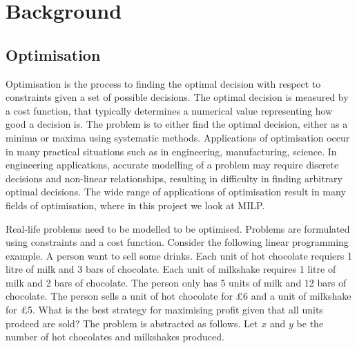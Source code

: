 \chapter{Background}

\section{Optimisation}

Optimisation is the process to finding the optimal decision with respect to constraints given a set of possible decisions. The optimal decision is measured by a cost function, that typically determines a numerical value representing how good a decision is. The problem is to either find the optimal decision, either as a minima or maxima using systematic methods. Applications of optimisation occur in many practical situations such as in engineering, manufacturing, science. In engineering applications, accurate modelling of a problem may require discrete decisions and non-linear relationships, resulting in difficulty in finding arbitrary optimal decisions. The wide range of applications of optimisation result in  many fields of optimisation, where in this project we look at MILP.
\begin{center}
\end{center}
Real-life problems need to be modelled to be optimised. Problems are formulated using constraints and a cost function. Consider the following linear programming example. A person want to sell some drinks. Each unit of hot chocolate requiers 1 litre of milk and 3 bars of chocolate. Each unit of milkshake requires 1 litre of milk and 2 bars of chocolate. The person only has 5 units of milk and 12 bars of chocolate. The person sells a unit of hot chocolate for £6 and a unit of milkshake for £5. What is the best strategy for maximising profit given that all units prodced are sold? The problem is abstracted as follows. Let $x$ and $y$ be the number of hot chocolates and milkshakes produced.
